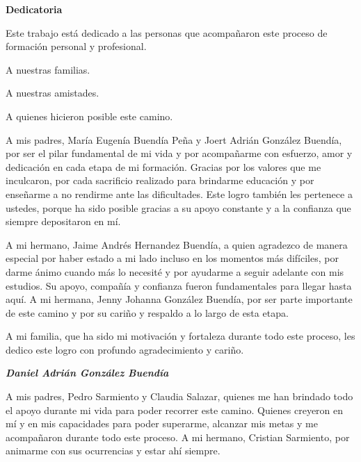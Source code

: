 \begin{center}
    \textbf{Dedicatoria}
    
    Este trabajo está dedicado a las personas que acompañaron este proceso de formación personal y profesional.
    
    \vspace{7cm}
    
    A nuestras familias.
    
    A nuestras amistades.
    
    A quienes hicieron posible este camino.

\end{center}

\newpage

\vspace{1cm}

A mis padres, María Eugenía Buendía Peña y Joert Adrián González Buendía, por ser el pilar fundamental de mi vida y por acompañarme con esfuerzo, amor y dedicación en cada etapa de mi formación. Gracias por los valores que me inculcaron, por cada sacrificio realizado para brindarme educación y por enseñarme a no rendirme ante las dificultades. Este logro también les pertenece a ustedes, porque ha sido posible gracias a su apoyo constante y a la confianza que siempre depositaron en mí.

A mi hermano, Jaime Andrés Hernandez Buendía, a quien agradezco de manera especial por haber estado a mi lado incluso en los momentos más difíciles, por darme ánimo cuando más lo necesité y por ayudarme a seguir adelante con mis estudios. Su apoyo, compañía y confianza fueron fundamentales para llegar hasta aquí. A mi hermana, Jenny Johanna González Buendía, por ser parte importante de este camino y por su cariño y respaldo a lo largo de esta etapa.

A mi familia, que ha sido mi motivación y fortaleza durante todo este proceso, les dedico este logro con profundo agradecimiento y cariño.

\begin{flushright}
    \textbf{\textit{Daniel Adrián González Buendía}}
\end{flushright}


\newpage

\vspace{1cm}

A mis padres, Pedro Sarmiento y Claudia Salazar, quienes me han brindado todo el apoyo durante mi vida para poder recorrer este camino. Quienes creyeron en mí y en mis capacidades para poder superarme, alcanzar mis metas y me acompañaron durante todo este proceso. A mi hermano, Cristian Sarmiento, por animarme con sus ocurrencias y estar ahí siempre.

